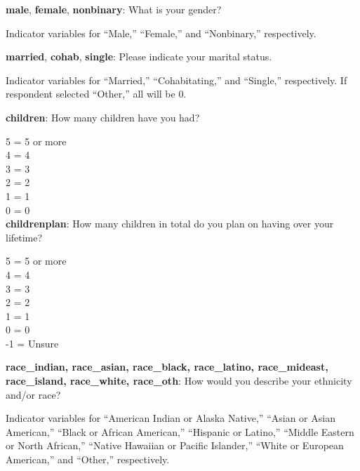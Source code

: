\documentclass[11pt, headsepline]{article}
\begin{document}
\textbf{male}, \textbf{female}, \textbf{nonbinary}: What is your gender?

Indicator variables for ``Male,'' ``Female,'' and ``Nonbinary,'' respectively.

\textbf{married}, \textbf{cohab}, \textbf{single}: Please indicate your marital status.

Indicator variables for ``Married,'' ``Cohabitating,'' and ``Single,'' respectively. If respondent selected ``Other,'' all will be 0.





\textbf{children}: How many children have you had?

5 = 5 or more\\
4 = 4 \\
3 = 3 \\
2 = 2 \\
1 = 1 \\
0 = 0 \\

\textbf{childrenplan}: How many children in total do you plan on having over your lifetime?

5 = 5 or more\\
4 = 4 \\
3 = 3 \\
2 = 2 \\
1 = 1 \\
0 = 0 \\
-1 = Unsure

\textbf{race\_indian, race\_asian, race\_black, race\_latino, race\_mideast, race\_island, race\_white, race\_oth}: How would you describe your ethnicity and/or race?

Indicator variables for ``American Indian or Alaska Native,'' ``Asian or Asian American,'' ``Black or African American,'' ``Hispanic or Latino,'' ``Middle Eastern or North African,'' ``Native Hawaiian or Pacific Islander,'' ``White or European American,'' and ``Other,'' respectively.
\end{document}
